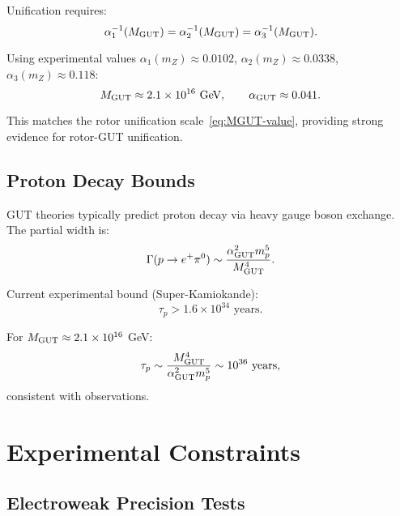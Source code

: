 \documentclass[11pt,a4paper]{article}
\numberwithin{equation}{section}
\theoremstyle{plain}
\theoremstyle{definition}
\theoremstyle{remark}
\begin{document}
Unification requires:
\begin{equation}
\alpha_1^{-1}(M_{\rm GUT}) = \alpha_2^{-1}(M_{\rm GUT}) = \alpha_3^{-1}(M_{\rm GUT}).
\label{eq:unification-condition}
\end{equation}

Using experimental values $\alpha_1(m_Z)\approx 0.0102$, $\alpha_2(m_Z)\approx 0.0338$, $\alpha_3(m_Z)\approx 0.118$:
\begin{equation}
M_{\rm GUT} \approx 2.1\times 10^{16}\text{ GeV}, \qquad \alpha_{\rm GUT}\approx 0.041.
\label{eq:GUT-prediction}
\end{equation}

This matches the rotor unification scale~\eqref{eq:MGUT-value}, providing strong evidence for rotor-GUT unification.

\subsection{Proton Decay Bounds}

GUT theories typically predict proton decay via heavy gauge boson exchange. The partial width is:
\begin{equation}
\Gamma(p\to e^+\pi^0) \sim \frac{\alpha_{\rm GUT}^2 m_p^5}{M_{\rm GUT}^4}.
\label{eq:proton-decay}
\end{equation}

Current experimental bound (Super-Kamiokande):
\begin{equation}
\tau_p > 1.6\times 10^{34}\text{ years}.
\label{eq:tau-p-bound}
\end{equation}

For $M_{\rm GUT}\approx 2.1\times 10^{16}$ GeV:
\begin{equation}
\tau_p \sim \frac{M_{\rm GUT}^4}{\alpha_{\rm GUT}^2 m_p^5} \sim 10^{36}\text{ years},
\label{eq:tau-p-prediction}
\end{equation}
consistent with observations.

\vspace{1em}

\section{Experimental Constraints}\label{sec:exp}

\subsection{Electroweak Precision Tests}
\end{document}
